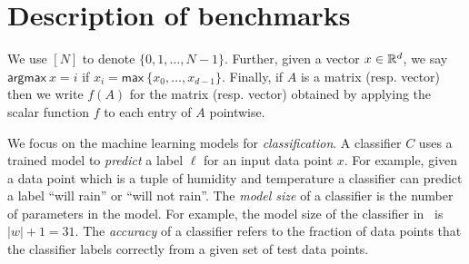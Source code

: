 
\section{Description of benchmarks}\label{app:benchmarks}
We use $[N]$ to denote $\{0,1,\dotsc, N-1\}$. Further, given a vector
$x\in{\mathbb{R}}^d$, we say $\mathsf{argmax}\ x = i$ if $x_i =
\mathsf{max}\ \{x_0,\ldots,x_{d-1}\}$. Finally, if $A$ is
a matrix (resp. vector) then we write $f(A)$ for the matrix (resp. vector)
obtained by applying the scalar function $f$ to each entry of $A$
pointwise.

We focus on the machine
learning models for {\it classification}. A classifier $C$ uses a
trained model to {\it predict} a
label $\ell$ for an input data point $x$. For example, given a
data point which is a tuple of humidity and temperature 
a classifier can predict a label ``will rain'' or ``will not rain''.
The {\it model size} of a classifier is the number of parameters in the model.
For example, the model size of the classifier in~ is $|w|+1=31$.
The {\it
  accuracy} of a classifier refers to the fraction of data points that
the classifier labels correctly from a given set of test data
points.

